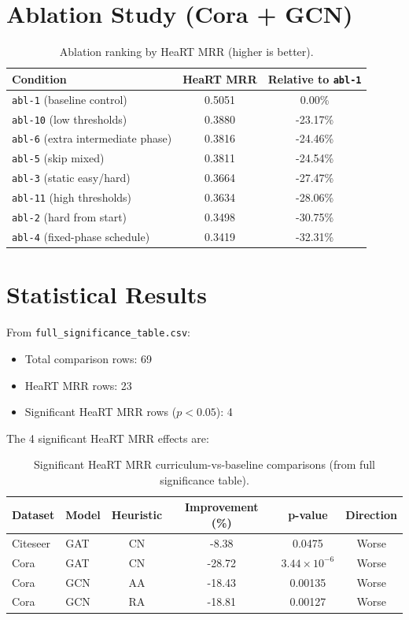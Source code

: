 \documentclass[11pt]{article}
\begin{document}
\section{Ablation Study (Cora + GCN)}

\begin{table}[h]
\centering
\caption{Ablation ranking by HeaRT MRR (higher is better).}
\begin{tabular}{lcc}
\toprule
Condition & HeaRT MRR & Relative to \texttt{abl-1} \\
\midrule
\texttt{abl-1} (baseline control) & 0.5051 & 0.00\% \\
\texttt{abl-10} (low thresholds) & 0.3880 & -23.17\% \\
\texttt{abl-6} (extra intermediate phase) & 0.3816 & -24.46\% \\
\texttt{abl-5} (skip mixed) & 0.3811 & -24.54\% \\
\texttt{abl-3} (static easy/hard) & 0.3664 & -27.47\% \\
\texttt{abl-11} (high thresholds) & 0.3634 & -28.06\% \\
\texttt{abl-2} (hard from start) & 0.3498 & -30.75\% \\
\texttt{abl-4} (fixed-phase schedule) & 0.3419 & -32.31\% \\
\bottomrule
\end{tabular}
\end{table}

\section{Statistical Results}

From \texttt{full\_significance\_table.csv}:

\begin{itemize}
\item Total comparison rows: 69
\item HeaRT MRR rows: 23
\item Significant HeaRT MRR rows ($p<0.05$): 4
\end{itemize}

The 4 significant HeaRT MRR effects are:

\begin{table}[h]
\centering
\caption{Significant HeaRT MRR curriculum-vs-baseline comparisons (from full significance table).}
\begin{tabular}{llcccc}
\toprule
Dataset & Model & Heuristic & Improvement (\%) & p-value & Direction \\
\midrule
Citeseer & GAT & CN & -8.38 & 0.0475 & Worse \\
Cora & GAT & CN & -28.72 & $3.44\times10^{-6}$ & Worse \\
Cora & GCN & AA & -18.43 & 0.00135 & Worse \\
Cora & GCN & RA & -18.81 & 0.00127 & Worse \\
\bottomrule
\end{tabular}
\end{table}
\end{document}
